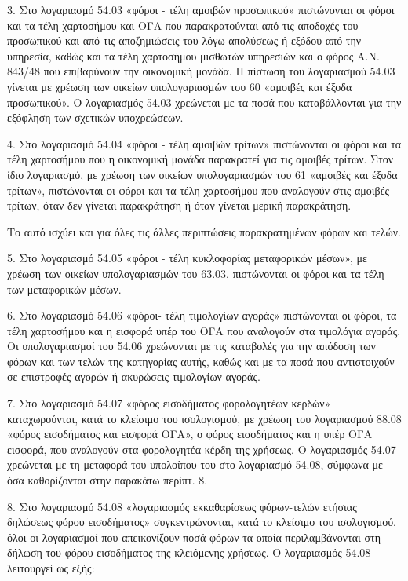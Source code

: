 \documentclass[A4,10pt,greek]{book}
\begin{document}
3. Στο λογαριασμό 54.03 «φόροι - τέλη αμοιβών προσωπικού» πιστώνονται οι φόροι και τα τέλη χαρτοσήμου και ΟΓΑ που παρακρατούνται από τις αποδοχές του προσωπικού και από τις αποζημιώσεις του λόγω απολύσεως ή εξόδου από την υπηρεσία, καθώς και τα τέλη χαρτοσήμου μισθωτών υπηρεσιών και ο φόρος Α.Ν.  843/48 που επιβαρύνουν την οικονομική μονάδα. Η πίστωση του λογαριασμού 54.03 γίνεται με χρέωση των οικείων υπολογαριασμών του 60 «αμοιβές και έξοδα προσωπικού». Ο λογαριασμός 54.03 χρεώνεται με τα ποσά που καταβάλλονται για την εξόφληση των σχετικών υποχρεώσεων.

4. Στο λογαριασμό 54.04 «φόροι - τέλη αμοιβών τρίτων» πιστώνονται οι φόροι και τα τέλη χαρτοσήμου που η οικονομική μονάδα παρακρατεί για τις αμοιβές τρίτων.  Στον ίδιο λογαριασμό, με χρέωση των οικείων υπολογαριασμών του 61 «αμοιβές και έξοδα τρίτων», πιστώνονται οι φόροι και τα τέλη χαρτοσήμου που αναλογούν στις αμοιβές τρίτων, όταν δεν γίνεται παρακράτηση ή όταν γίνεται μερική παρακράτηση.

Το αυτό ισχύει και για όλες τις άλλες περιπτώσεις παρακρατημένων φόρων και τελών.

5. Στο λογαριασμό 54.05 «φόροι - τέλη κυκλοφορίας μεταφορικών μέσων», με χρέωση των οικείων υπολογαριασμών του 63.03, πιστώνονται οι φόροι και τα τέλη των μεταφορικών μέσων.

6. Στο λογαριασμό 54.06 «φόροι- τέλη τιμολογίων αγοράς» πιστώνονται οι φόροι, τα τέλη χαρτοσήμου και η εισφορά υπέρ του ΟΓΑ που αναλογούν στα τιμολόγια αγοράς. Οι υπολογαριασμοί του 54.06 χρεώνονται με τις καταβολές για την απόδοση των φόρων και των τελών της κατηγορίας αυτής, καθώς και με τα ποσά που αντιστοιχούν σε επιστροφές αγορών ή ακυρώσεις τιμολογίων αγοράς.

7. Στο λογαριασμό 54.07 «φόρος εισοδήματος φορολογητέων κερδών» καταχωρούνται, κατά το κλείσιμο του ισολογισμού, με χρέωση του λογαριασμού 88.08 «φόρος εισοδήματος και εισφορά ΟΓΑ», ο φόρος εισοδήματος και η υπέρ ΟΓΑ εισφορά, που αναλογούν στα φορολογητέα κέρδη της χρήσεως. Ο λογαριασμός 54.07 χρεώνεται με τη μεταφορά του υπολοίπου του στο λογαριασμό 54.08, σύμφωνα με όσα καθορίζονται στην παρακάτω περίπτ. 8.

8. Στο λογαριασμό 54.08 «λογαριασμός εκκαθαρίσεως φόρων-τελών ετήσιας δηλώσεως φόρου εισοδήματος» συγκεντρώνονται, κατά το κλείσιμο του ισολογισμού, όλοι οι λογαριασμοί που απεικονίζουν ποσά φόρων τα οποία περιλαμβάνονται στη δήλωση του φόρου εισοδήματος της κλειόμενης χρήσεως. Ο λογαριασμός 54.08 λειτουργεί ως εξής:
\end{document}
